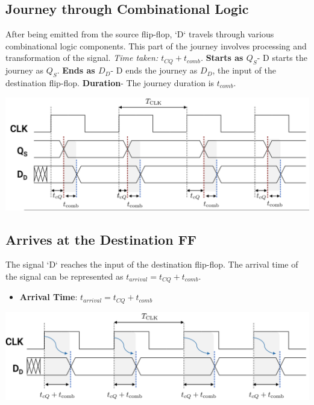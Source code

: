 \documentclass[12pt,openany]{book}
\begin{document}
\subsection{Journey through Combinational Logic}
\begin{minipage}{0.45\textwidth}
    After being emitted from the source flip-flop, `D` travels through various combinational logic components. \newline
	This part of the journey involves processing and transformation of the signal. \newline
	\textit{Time taken: $t_{CQ} + t_{comb}$.}\newline
	\vspace*{10px}
	\textbf{Starts as $Q_S$}- D starts the journey as $Q_S$. \newline
	\textbf{Ends as $D_D$}- D ends the journey as $D_D$, the input of the destination flip-flop. \newline
	\textbf{Duration}- The journey duration is $t_{comb}$. \newline

\end{minipage}
\hfill
\vline
\hfill
\begin{minipage}{0.45\textwidth}
    \centering
    \includegraphics[width=1.3\textwidth]{circuits/15.4.2.png}
\end{minipage}


\subsection{Arrives at the Destination FF}
\begin{minipage}{0.45\textwidth}
    The signal `D` reaches the input of the destination flip-flop. The arrival time of the signal can be represented as $t_{arrival} = t_{CQ} + t_{comb}$.
    \begin{itemize}
        \item[] \textbf{Arrival Time}: $t_{arrival} = t_{CQ} + t_{comb}$
    \end{itemize}
\end{minipage}
\hfill
\vline
\hfill
\begin{minipage}{0.45\textwidth}
    \centering
    \includegraphics[width=1.3\textwidth]{circuits/15.4.3.png}
\end{minipage}
\end{document}
